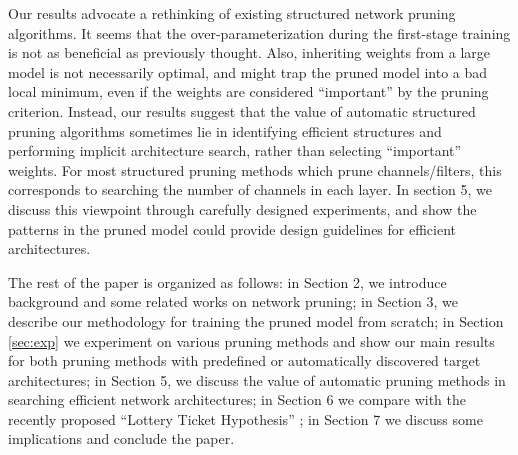 Our results advocate a rethinking of existing structured network pruning algorithms. It seems that the over-parameterization during the first-stage training is not as beneficial as previously thought. Also, inheriting weights from a large model is not necessarily optimal, and might trap the pruned model into a bad local minimum, even if the weights are considered ``important'' by the pruning criterion. Instead, our results suggest that the value of automatic structured pruning algorithms sometimes lie in identifying efficient structures and performing implicit architecture search, rather than selecting ``important'' weights. For most structured pruning methods which prune channels/filters, this corresponds to searching the number of channels in each layer. In section 5, we discuss this viewpoint through carefully designed experiments, and show the patterns in the pruned model could provide design guidelines for efficient architectures.

The rest of the paper is organized as follows: in Section 2, we introduce background and some related works on network pruning; in Section 3, we describe our methodology for training the pruned model from scratch; in Section \ref{sec:exp} we experiment on various pruning methods and show our main results for both pruning methods with predefined or automatically discovered target architectures; in Section 5, we discuss the value of automatic pruning methods in searching efficient network architectures; in Section 6 we compare with the recently proposed ``Lottery Ticket Hypothesis'' \citep{lottery}; in Section 7 we discuss some implications and conclude the paper.
